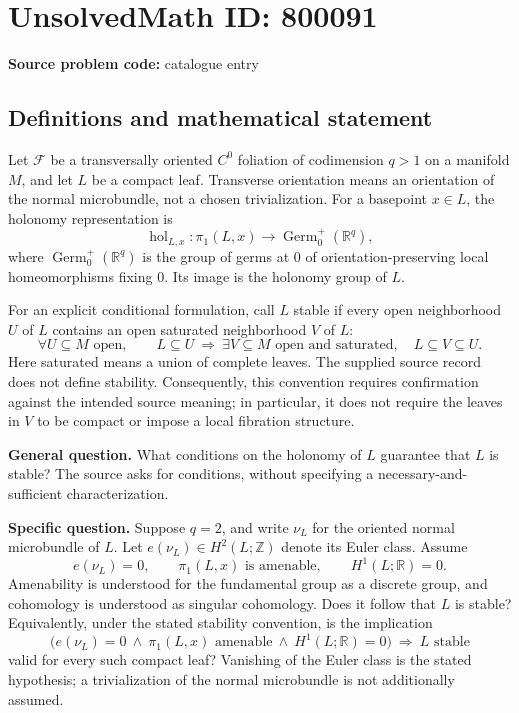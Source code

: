 \documentclass[11pt]{article}
\newcommand{\Z}{\mathbb{Z}}
\newcommand{\R}{\mathbb{R}}
\begin{document}
\section*{UnsolvedMath ID: 800091}
\textbf{Source problem code:} catalogue entry
\subsection{Definitions and mathematical statement}
Let \(\mathcal F\) be a transversally oriented \(C^0\) foliation of codimension \(q>1\) on a manifold \(M\), and let \(L\) be a compact leaf. Transverse orientation means an orientation of the normal microbundle, not a chosen trivialization. For a basepoint \(x\in L\), the holonomy representation is
\[
\operatorname{hol}_{L,x}\colon \pi_1(L,x)\longrightarrow \operatorname{Germ}_0^+(\R^q),
\]
where \(\operatorname{Germ}_0^+(\R^q)\) is the group of germs at \(0\) of orientation-preserving local homeomorphisms fixing \(0\). Its image is the holonomy group of \(L\).

For an explicit conditional formulation, call \(L\) stable if every open neighborhood \(U\) of \(L\) contains an open saturated neighborhood \(V\) of \(L\):
\[
\forall U\subseteq M\text{ open},\qquad
L\subseteq U\ \Longrightarrow\ \exists V\subseteq M\text{ open and saturated},\quad L\subseteq V\subseteq U.
\]
Here saturated means a union of complete leaves. The supplied source record does not define stability. Consequently, this convention requires confirmation against the intended source meaning; in particular, it does not require the leaves in \(V\) to be compact or impose a local fibration structure.

\textbf{General question.} What conditions on the holonomy of \(L\) guarantee that \(L\) is stable? The source asks for conditions, without specifying a necessary-and-sufficient characterization.

\textbf{Specific question.} Suppose \(q=2\), and write \(\nu_L\) for the oriented normal microbundle of \(L\). Let \(e(\nu_L)\in H^2(L;\Z)\) denote its Euler class. Assume
\[
e(\nu_L)=0,\qquad
\pi_1(L,x)\text{ is amenable},\qquad
H^1(L;\R)=0.
\]
Amenability is understood for the fundamental group as a discrete group, and cohomology is understood as singular cohomology. Does it follow that \(L\) is stable? Equivalently, under the stated stability convention, is the implication
\[
\bigl(e(\nu_L)=0\ \land\ \pi_1(L,x)\text{ amenable}\ \land\ H^1(L;\R)=0\bigr)
\ \Longrightarrow\ L\text{ stable}
\]
valid for every such compact leaf? Vanishing of the Euler class is the stated hypothesis; a trivialization of the normal microbundle is not additionally assumed.
\end{document}
